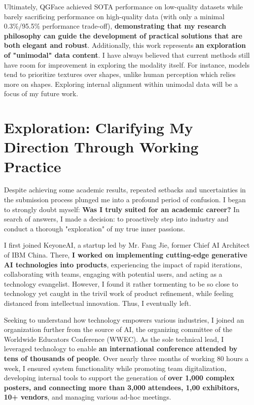 \documentclass[11pt, letterpaper]{article}
\let\oldtextbf\textbf
\renewcommand{\textbf}[1]{{\color{black}\oldtextbf{#1}}}
\begin{document}
Ultimately, QGFace achieved SOTA performance on low-quality datasets while barely sacrificing performance on high-quality data (with only a minimal 0.3\%/95.5\% performance trade-off), \textbf{demonstrating that my research philosophy can guide the development of practical solutions that are both elegant and robust}. Additionally, this work represents \textbf{an exploration of "unimodal" data content}. I have always believed that current methods still have room for improvement in exploring the modality itself. For instance, models tend to prioritize textures over shapes, unlike human perception which relies more on shapes. Exploring internal alignment within unimodal data will be a focus of my future work.

\section{Exploration: Clarifying My Direction Through Working Practice }

Despite achieving some academic results, repeated setbacks and uncertainties in the submission process plunged me into a profound period of confusion. I began to strongly doubt myself: \textbf{Was I truly suited for an academic career?} In search of answers, I made a decision: to proactively step into industry and conduct a thorough "exploration" of my true inner passions.

I first joined KeyoneAI, a startup led by Mr. Fang Jie, former Chief AI Architect of IBM China. There, \textbf{I worked on implementing cutting-edge generative AI technologies into products}, experiencing the impact of rapid iterations, collaborating with teams, engaging with potential users, and acting as a technology evangelist. However, I found it rather tormenting to be so close to technology yet caught in the trivil work of product refinement, while feeling distanced from intellectual innovation. Thus, I eventually left.

Seeking to understand how technology empowers various industries, I joined an organization further from the source of AI, the organizing committee of the Worldwide Educators Conference (WWEC)\cite{wwec}.
As the sole technical lead, I leveraged technology to enable \textbf{an international conference attended by tens of thousands of people}. Over nearly three months of working 80 hours a week, I ensured system functionality while promoting team digitalization, developing internal tools to support the generation of \textbf{over 1,000 complex posters, and connecting more than 3,000 attendees, 1,00 exhibitors, 10+ vendors}, and managing various ad-hoc meetings.
\end{document}
